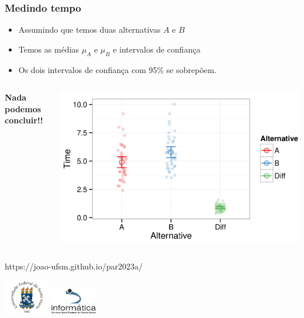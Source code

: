 \documentclass[xcolor={usenames,dvipsnames},12pt,presentation,aspectratio=169]{beamer}
\begin{document}
\begin{frame}[fragile]
  \frametitle{Medindo tempo}
  \begin{itemize}
    \item Assumindo que temos duas alternativas $A$ e $B$ 
    \item Temos as médias $\mu_{A}$ e $\mu_{B}$ e intervalos de confiança
    \item Os dois intervalos de confiança com 95\% se sobrepõem.
  \end{itemize}
  \begin{columns}
    \begin{column}{0.4\textwidth}
    \textbf{Nada podemos concluir!!}
    \end{column}
    \begin{column}{0.6\textwidth}
      \begin{center}
        \includegraphics[width=\textwidth]{ci3.png}
     \end{center}           
    \end{column}
  \end{columns}
\end{frame}
\begin{frame}[plain]{}
  \begin{center}
    \vspace{2cm}
    \Large{https://joao-ufsm.github.io/par2023a/}
    
    \vspace{1cm}
    \includegraphics[width=2cm]{logo_ufsm}
    \hspace{0.5cm}
    \includegraphics[width=2cm]{logo_inf}
  \end{center}
\end{frame}
\end{document}
